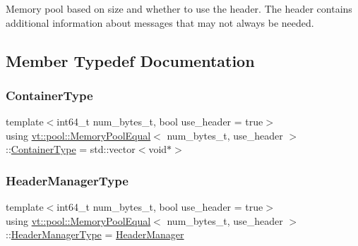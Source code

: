 Memory pool based on size and whether to use the header. The header contains additional information about messages that may not always be needed. 

\subsection{Member Typedef Documentation}
\mbox{\label{structvt_1_1pool_1_1_memory_pool_equal_adfcfe5caf881b17d4c0355291c4f707f}} 
\subsubsection{\texorpdfstring{Container\+Type}{ContainerType}}
{\footnotesize\ttfamily template$<$int64\+\_\+t num\+\_\+bytes\+\_\+t, bool use\+\_\+header = true$>$ \\
using \hyperlink{structvt_1_1pool_1_1_memory_pool_equal}{vt\+::pool\+::\+Memory\+Pool\+Equal}$<$ num\+\_\+bytes\+\_\+t, use\+\_\+header $>$\+::\hyperlink{structvt_1_1pool_1_1_memory_pool_equal_adfcfe5caf881b17d4c0355291c4f707f}{Container\+Type} =  std\+::vector$<$void$\ast$$>$}

\mbox{\label{structvt_1_1pool_1_1_memory_pool_equal_aede857d1f5e084ce6a25f9a499c74047}} 
\subsubsection{\texorpdfstring{Header\+Manager\+Type}{HeaderManagerType}}
{\footnotesize\ttfamily template$<$int64\+\_\+t num\+\_\+bytes\+\_\+t, bool use\+\_\+header = true$>$ \\
using \hyperlink{structvt_1_1pool_1_1_memory_pool_equal}{vt\+::pool\+::\+Memory\+Pool\+Equal}$<$ num\+\_\+bytes\+\_\+t, use\+\_\+header $>$\+::\hyperlink{structvt_1_1pool_1_1_memory_pool_equal_aede857d1f5e084ce6a25f9a499c74047}{Header\+Manager\+Type} =  \hyperlink{structvt_1_1pool_1_1_header_manager}{Header\+Manager}}


